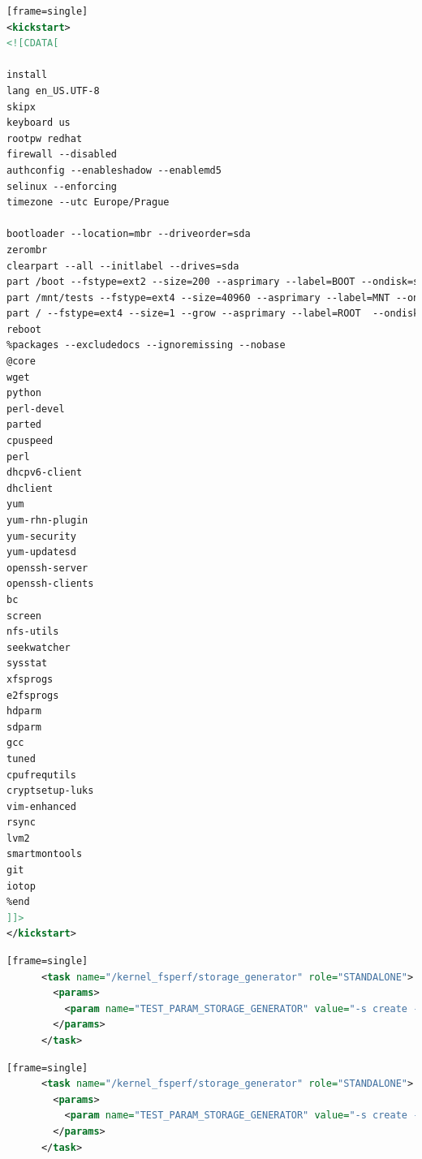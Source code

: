 \documentclass[
  color, %
  table, %
  lof,   %
  lot,   %
]{fithesis3}
\begin{document}
\begin{lstlisting}[language=xml, caption={Configuring environment using kickstart}, label={ex:kickstart}][frame=single]
<kickstart>
<![CDATA[

install
lang en_US.UTF-8
skipx
keyboard us
rootpw redhat 
firewall --disabled
authconfig --enableshadow --enablemd5
selinux --enforcing
timezone --utc Europe/Prague

bootloader --location=mbr --driveorder=sda
zerombr
clearpart --all --initlabel --drives=sda
part /boot --fstype=ext2 --size=200 --asprimary --label=BOOT --ondisk=sda
part /mnt/tests --fstype=ext4 --size=40960 --asprimary --label=MNT --ondisk=sda
part / --fstype=ext4 --size=1 --grow --asprimary --label=ROOT  --ondisk=sda
reboot
%packages --excludedocs --ignoremissing --nobase
@core
wget
python
perl-devel
parted
cpuspeed
perl
dhcpv6-client
dhclient
yum
yum-rhn-plugin
yum-security
yum-updatesd
openssh-server
openssh-clients
bc
screen
nfs-utils
seekwatcher
sysstat
xfsprogs
e2fsprogs
hdparm
sdparm
gcc
tuned
cpufrequtils
cryptsetup-luks
vim-enhanced
rsync
lvm2
smartmontools
git
iotop
%end			
]]>
</kickstart>
\end{lstlisting}

\begin{lstlisting}[language=xml, caption={Executing task and passing arguments}][frame=single]
      <task name="/kernel_fsperf/storage_generator" role="STANDALONE">
        <params>
          <param name="TEST_PARAM_STORAGE_GENERATOR" value="-s create -f ext4 -t single -m /RHTSspareLUN1 -d /dev/sdc -T 1SASHDD_ext4"/>
        </params>
      </task>
\end{lstlisting}

\begin{lstlisting}[language=xml, caption={Configuring storage using storage generator in beaker environment}][frame=single]
      <task name="/kernel_fsperf/storage_generator" role="STANDALONE">
        <params>
          <param name="TEST_PARAM_STORAGE_GENERATOR" value="-s create -f xfs -t lvm -m /RHTSspareLUN1 -r jokerlvm -T 2SATASSDLVM_xfs"/>
        </params>
      </task>
\end{lstlisting}
\end{document}
